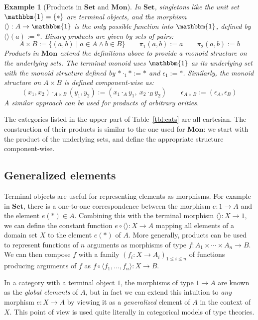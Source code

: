 \documentclass[11pt,oneside]{book}
\newtheorem{example}[theorem]{Example}
\theoremstyle{definition}
\begin{document}
\begin{example}[Products in $\mathbf{Set}$ and $\mathbf{Mon}$] %
In $\mathbf{Set}$,
singletons like the unit set $\mathbbm{1} = \{ * \}$
are terminal objects,
and the morphism $\langle \rangle : A \rightarrow \mathbbm{1}$
is the only possible function into $\mathbbm{1}$,
defined by $\langle \rangle(a) := *$.
Binary products are given by sets of pairs:
\[
  A \times B := \{ (a, b) \mid a \in A \wedge b \in B \}
  \qquad
  \pi_1(a, b) := a
  \qquad
  \pi_2(a, b) := b
\]
Products in $\mathbf{Mon}$ extend the definitions above
to provide a monoid structure on the underlying sets.
The terminal monoid uses $\mathbbm{1}$ as its underlying set
with the monoid structure
defined by ${*} \cdot_1 {*} := {*}$ and $\epsilon_1 := {*}$.
Similarly,
the monoid structure on $A \times B$ is defined component-wise as:
\[
  (x_1, x_2) \cdot_{A \times B} (y_1, y_2) :=
    (x_1 \cdot_A y_1, \: x_2 \cdot_B y_2)
  \qquad
  \epsilon_{A \times B} :=
    (\epsilon_A, \epsilon_B)
\]
A similar approach can be used for products of arbitrary arities.
\end{example}

The categories listed
in the upper part of Table~\ref{tbl:cats} are all cartesian.
The construction of their products is similar to
the one used for $\mathbf{Mon}$:
we start with the product of the underlying sets,
and define the appropriate structure component-wise.


\subsection{Generalized elements} %

Terminal objects are useful for representing elements as morphisms.
For example in $\mathbf{Set}$,
there is a one-to-one correspondence between the morphism
$e : 1 \rightarrow A$ and the element $e(*) \in A$.
Combining this with the terminal morphism $\langle \rangle : X \rightarrow 1$,
we can define the constant function
$e \circ \langle \rangle : X \rightarrow A$
mapping all elements of a domain set $X$
to the element $e(*)$ of $A$.
More generally,
products can be used to represent functions
of $n$ arguments as morphisms of type
$f : A_1 \times \cdots \times A_n \rightarrow B$.
We can then compose $f$ with a family
$(f_i : X \rightarrow A_i)_{1 \le i \le n}$
of functions producing arguments of $f$
as $f \circ \langle f_1, \ldots, f_n \rangle : X \rightarrow B$.

In a category with a terminal object $1$,
the morphisms of type $1 \rightarrow A$ are known as
the \emph{global elements} of $A$,
but in fact we can extend this intuition to \emph{any}
morphism $e : X \rightarrow A$
by viewing it as a \emph{generalized} element of $A$
in the context of $X$.
This point of view is used quite literally
in categorical models of type theories.
\end{document}
